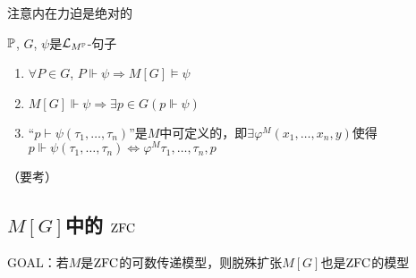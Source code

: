 \documentclass[11pt]{article}
\begin{document}
注意内在力迫是绝对的

\begin{theorem}[力迫定理]
\(\P\), \(G\), \(\psi\)是\(\call_{M^{\P}}\)-句子
\begin{enumerate}
\item \(\forall P\in G\), \(P\Vdash\psi\Rightarrow M[G]\vDash\psi\)
\item \(M[G]\Vdash\psi\Rightarrow\exists p\in G(p\Vdash\psi)\)
\item ``\(p\vdash\psi(\tau_1,\dots,\tau_n)\)''是\(M\)中可定义的，即\(\exists\varphi^M(x_1,\dots,x_n,y)\)使得
\(p\Vdash\psi(\tau_1,\dots,\tau_n)\Leftrightarrow\varphi^M{\tau_1,\dots,\tau_n,p}\)
\end{enumerate}
\end{theorem}

（要考）
\subsection{\texorpdfstring{\(M[G]\)}{M[G]}中的 \texorpdfstring{\(\ZFC\)}{ZFC}}
\label{sec:org8d00ca7}
GOAL：若\(M\)是\(\ZFC\)的可数传递模型，则脱殊扩张\(M[G]\)也是\(\ZFC\)的模型
\end{document}
